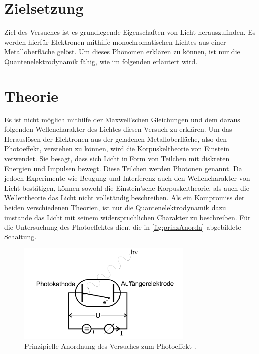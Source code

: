 \section{Zielsetzung}
\label{sec:ziel}

Ziel des Versuches ist es grundlegende Eigenschaften von Licht herauszufinden. Es werden hierfür
Elektronen mithilfe monochromatischen Lichtes aus einer Metalloberfläche gelöst.
Um dieses Phönomen erklären zu können, ist nur die Quantenelektrodynamik fähig, wie im folgenden erläutert wird.

\section{Theorie}
\label{sec:Theorie}

Es ist nicht möglich mithilfe der Maxwell'schen Gleichungen und dem daraus folgenden Wellencharakter des Lichtes diesen Versuch zu erklären.
Um das Herauslösen der Elektronen aus der geladenen Metalloberfläche, also den Photoeffekt, verstehen zu können, wird die Korpuskeltheorie von Einstein verwendet.
Sie besagt, dass sich Licht in Form von Teilchen mit diskreten Energien und Impulsen bewegt. Diese Teilchen werden Photonen genannt.
Da jedoch Experimente wie Beugung und Interferenz auch den Wellencharakter von Licht bestätigen, können sowohl die Einstein'sche Korpuskeltheorie, als auch
die Wellentheorie das Licht nicht vollständig beschreiben. Als ein Kompromiss der beiden verschiedenen Theorien, ist nur die Quantenelektrodynamik dazu
imstande das Licht mit seinem widersprüchlichen Charakter zu beschreiben.\newline
Für die Untersuchung des Photoeffektes dient die in \autoref{fig:prinzAnordn} abgebildete Schaltung.

\begin{figure}[H]
    \centering
    \includegraphics[width = 0.75\textwidth]{data/prinzAnordnung.png}
    \caption{Prinzipielle Anordnung des Versuches zum Photoeffekt \cite{Anleitung500}.}
    \label{fig:prinzAnordn}
\end{figure}

